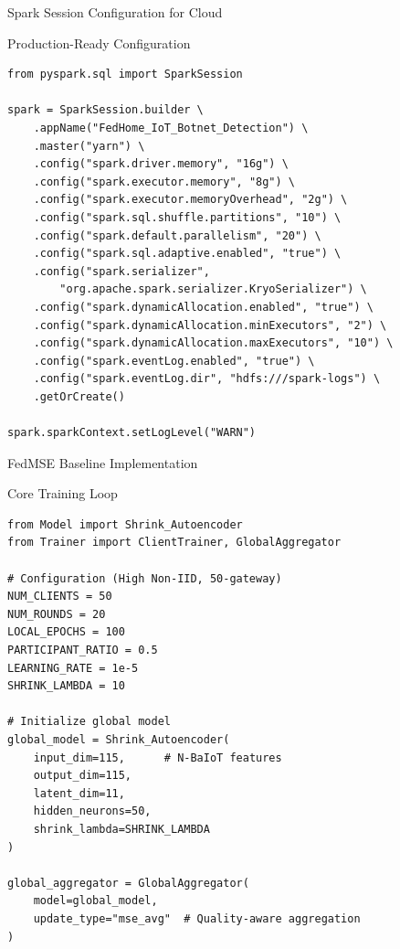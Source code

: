 \documentclass[10pt, aspectratio=169]{beamer}
\begin{document}
\begin{frame}[t]{Spark Session Configuration for Cloud}
    \begin{block}{Production-Ready Configuration}
        \begin{lstlisting}[basicstyle=\ttfamily\scriptsize]
from pyspark.sql import SparkSession

spark = SparkSession.builder \
    .appName("FedHome_IoT_Botnet_Detection") \
    .master("yarn") \
    .config("spark.driver.memory", "16g") \
    .config("spark.executor.memory", "8g") \
    .config("spark.executor.memoryOverhead", "2g") \
    .config("spark.sql.shuffle.partitions", "10") \
    .config("spark.default.parallelism", "20") \
    .config("spark.sql.adaptive.enabled", "true") \
    .config("spark.serializer", 
        "org.apache.spark.serializer.KryoSerializer") \
    .config("spark.dynamicAllocation.enabled", "true") \
    .config("spark.dynamicAllocation.minExecutors", "2") \
    .config("spark.dynamicAllocation.maxExecutors", "10") \
    .config("spark.eventLog.enabled", "true") \
    .config("spark.eventLog.dir", "hdfs:///spark-logs") \
    .getOrCreate()

spark.sparkContext.setLogLevel("WARN")
        \end{lstlisting}
    \end{block}
\end{frame}

\begin{frame}[t]{FedMSE Baseline Implementation}
    \begin{block}{Core Training Loop}
        \begin{lstlisting}[basicstyle=\ttfamily\scriptsize]
from Model import Shrink_Autoencoder
from Trainer import ClientTrainer, GlobalAggregator

# Configuration (High Non-IID, 50-gateway)
NUM_CLIENTS = 50
NUM_ROUNDS = 20
LOCAL_EPOCHS = 100
PARTICIPANT_RATIO = 0.5
LEARNING_RATE = 1e-5
SHRINK_LAMBDA = 10

# Initialize global model
global_model = Shrink_Autoencoder(
    input_dim=115,      # N-BaIoT features
    output_dim=115,
    latent_dim=11,
    hidden_neurons=50,
    shrink_lambda=SHRINK_LAMBDA
)

global_aggregator = GlobalAggregator(
    model=global_model,
    update_type="mse_avg"  # Quality-aware aggregation
)
        \end{lstlisting}
    \end{block}
\end{frame}
\end{document}
